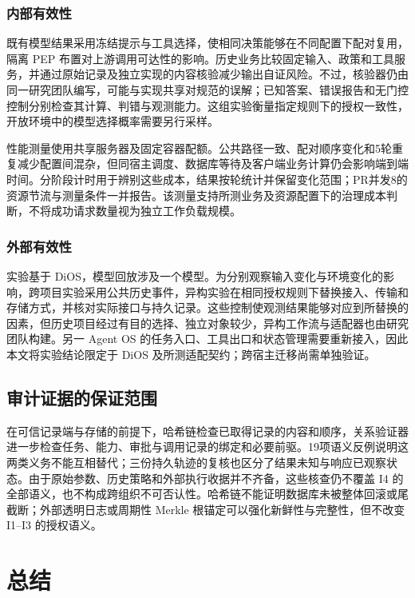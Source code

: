 \subsubsection{内部有效性}

既有模型结果采用冻结提示与工具选择，使相同决策能够在不同配置下配对复用，隔离 PEP 布置对上游调用可达性的影响。历史业务比较固定输入、政策和工具服务，并通过原始记录及独立实现的内容核验减少输出自证风险。不过，核验器仍由同一研究团队编写，可能与实现共享对规范的误解；已知答案、错误报告和无门控控制分别检查其计算、判错与观测能力。这组实验衡量指定规则下的授权一致性，开放环境中的模型选择概率需要另行采样。

性能测量使用共享服务器及固定容器配额。公共路径一致、配对顺序变化和5轮重复减少配置间混杂，但同宿主调度、数据库等待及客户端业务计算仍会影响端到端时间。分阶段计时用于辨别这些成本，结果按轮统计并保留变化范围；PR并发8的资源节流与测量条件一并报告。该测量支持所测业务及资源配置下的治理成本判断，不将成功请求数量视为独立工作负载规模。

\subsubsection{外部有效性}

实验基于 DiOS，模型回放涉及一个模型。为分别观察输入变化与环境变化的影响，跨项目实验采用公共历史事件，异构实验在相同授权规则下替换接入、传输和存储方式，并核对实际接口与持久记录。这些控制使观测结果能够对应到所替换的因素，但历史项目经过有目的选择、独立对象较少，异构工作流与适配器也由研究团队构建。另一 Agent OS 的任务入口、工具出口和状态管理需要重新接入，因此本文将实验结论限定于 DiOS 及所测适配契约；跨宿主迁移尚需单独验证。

\subsection{审计证据的保证范围}

在可信记录端与存储的前提下，哈希链检查已取得记录的内容和顺序，关系验证器进一步检查任务、能力、审批与调用记录的绑定和必要前驱。19项语义反例说明这两类义务不能互相替代；三份持久轨迹的复核也区分了结果未知与响应已观察状态。由于原始参数、历史策略和外部执行收据并不齐备，这些核查仍不覆盖 I4 的全部语义，也不构成跨组织不可否认性。哈希链不能证明数据库未被整体回滚或尾截断；外部透明日志或周期性 Merkle 根锚定可以强化新鲜性与完整性，但不改变 I1--I3 的授权语义。

\section{总结}\label{sec:conclusion-v11}

